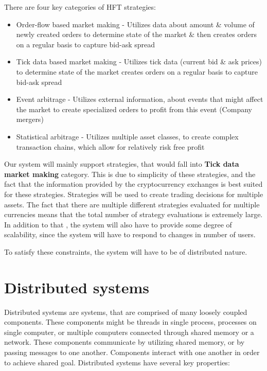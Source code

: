 There are four key categories of HFT strategies\cite{wiki:hft}:
\begin{itemize}
    \item {Order-flow based market making -
    Utilizes data about amount \& volume of newly created orders to determine state of the market \& then
    creates orders on a regular basis to capture bid-ask spread }
    \item {Tick data based market making - Utilizes tick data (current bid \& ask prices) to determine state of the market
    creates orders on a regular basis to capture bid-ask spread }
    \item {Event arbitrage - Utilizes external information, about events that might affect the market to
    create specialized orders to profit from this event (Company mergers)}
    \item {Statistical arbitrage - Utilizes multiple asset classes, to create complex transaction chains, which allow for relatively risk free profit }
\end{itemize}

Our system will mainly support strategies, that would fall into \textbf{Tick data market making} category. This is due
to simplicity of these strategies, and the fact that the information provided by the cryptocurrency exchanges is best suited
for these strategies. Strategies will be used to create trading decisions for multiple assets. The fact that
there are multiple different strategies evaluated for multiple currencies means that the total number of strategy evaluations is
extremely large. In addition to that , the system will also have to provide some degree of scalability, since the system will
have to respond to changes in number of users.

To satisfy these constraints, the system will have to be of distributed nature.

\section{Distributed systems}
Distributed systems are systems, that are comprised of many loosely coupled components. These components might be threads
in single process, processes on single computer, or multiple computers connected through shared memory or a network.
These components communicate by utilizing shared memory, or by passing messages to one another. Components interact with
one another in order to achieve shared goal. Distributed systems have several key properties\cite{Coulouris:2011:DSC:2029110}:

